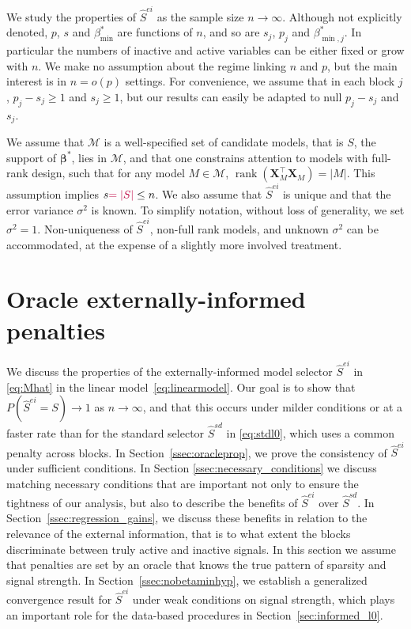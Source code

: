 \documentclass[
  12pt]{article}
\newcommand{\pch}[1]{{{\color{purple}  #1}}}
\newcommand{\M}{\mathcal{M}}
\newcommand{\bbeta}{\boldsymbol{\beta}}
\newcommand{\bX}{\mathbf{X}}
\begin{document}
We study the properties of $\hat{S}^{ei}$ as the sample size $n \to \infty$.
Although not explicitly denoted, $p$, $s$ and $\beta_{\min}^*$ are functions of $n$, and so are $s_j$, $p_j$ and $\beta_{\min,j}^*$. In particular the numbers of inactive and active variables can be either fixed or grow with $n$. We make no assumption about the regime linking $n$ and $p$, but the main interest is in $n= o(p)$ settings. \color{green}For convenience, we assume that in each block $j$, $p_j-s_j\geq1$ and $s_j\geq1$, but our results can easily be adapted to null $p_j-s_j$ and $s_j$.\color{black}

We assume that $\M$ is a well-specified set of candidate models, that is $S$, the support of $\bbeta^*$, lies in $\M$, and that one constrains attention to models with full-rank design, such that for any model $M \in \M$, $\operatorname{rank}(\bX_M^{\top}\bX_M)=|M|$. This assumption implies $s\pch{=|S|}\leq n$. We also assume that $\hat S^{ei}$ is unique and that the error variance $\sigma^2$ is known. To simplify notation, without loss of generality, we set $\sigma^2=1$. Non-uniqueness of $\hat{S}^{ei}$, non-full rank models, and unknown $\sigma^2$ can be accommodated, at the expense of a slightly more involved treatment.

\section{Oracle externally-informed penalties}\label{sec:properties_legression}

We discuss the properties of the externally-informed model selector $\hat S^{ei}$ in \eqref{eq:Mhat} in the linear model~\eqref{eq:linearmodel}. Our goal is to show that $P(\hat S^{ei}=S)\to 1$ as $n\to\infty$, and that this occurs under milder conditions or at a faster rate than for the standard selector $\hat S^{sd}$ in \eqref{eq:stdl0}, which uses a common penalty across blocks. In Section~\ref{ssec:oracleprop}, we prove the consistency of $\hat S^{ei}$ under sufficient conditions. In Section \ref{ssec:necessary_conditions} we discuss matching necessary conditions that are important not only to ensure the tightness of our analysis, but also to describe the benefits of $\hat S^{ei}$ over $\hat{S}^{sd}$. 
In Section~\ref{ssec:regression_gains}, we discuss these benefits in relation to the relevance of the external information, that is to what extent the blocks discriminate between truly active and inactive signals. In this section we assume that penalties are set by an oracle that knows the true pattern of sparsity and signal strength. In Section~\ref{ssec:nobetaminhyp}, we establish a generalized convergence result for $\hat S^{ei}$ under weak conditions on signal strength, which plays an important role for the data-based procedures in Section~\ref{sec:informed_l0}.
\end{document}
